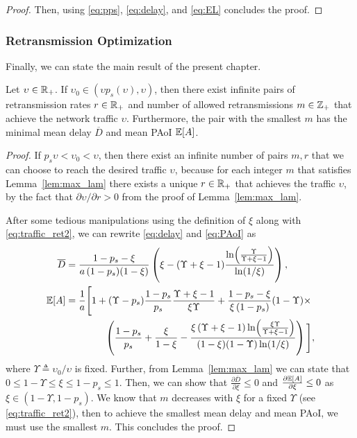 \begin{proof}
    Then, using \eqref{eq:pps}, \eqref{eq:delay}, and \eqref{eq:EL} concludes the proof.
\end{proof}

\subsubsection{Retransmission Optimization}
Finally, we can state the main result of the present chapter.%
\begin{proposition} \label{prop:best_m}
    Let $\upsilon\in{\mathbb R}_+$. If $\upsilon_0 \in (\upsilon p_s(\upsilon), \upsilon)$,
    then there exist infinite pairs of retransmission rates $r\in{\mathbb R}_+$ and number of allowed retransmissions $m\in{\mathbb Z}_+$ that achieve the network traffic $\upsilon$. Furthermore, the pair with the smallest $m$ has the minimal mean delay $\overline{D}$ and mean PAoI ${\mathbb E}[A]$.
\end{proposition}
%
\begin{proof}
    If $p_s \upsilon < \upsilon_0 < \upsilon$, then there exist an infinite number of pairs $m,r$ that we can choose to reach the desired traffic $\upsilon$, because for each integer $m$ that satisfies Lemma~\ref{lem:max_lam} there exists a unique $r\in{\mathbb R}_+$ that achieves the traffic $\upsilon$, by the fact that $\partial\upsilon/\partial r > 0$ from the proof of Lemma~\ref{lem:max_lam}.
    
    After some tedious manipulations using the definition of $\xi$ along with \eqref{eq:traffic_ret2}, we can rewrite \eqref{eq:delay} and \eqref{eq:PAoI} as
    \begin{align*}
        \overline D &= \frac{1-p_s-\xi}{ a\,(1-p_s)(1-\xi)} \left( \xi - (\Upsilon+\xi-1) \frac{\ln\!\left(\frac{\Upsilon}{\Upsilon+\xi-1}\right)}{\ln(1/\xi)} \right),\\
        {\mathbb E}[A] &= \frac{1}{a}\Bigg[ 1 + (\Upsilon-p_s)\frac{1-p_s}{p_s} \frac{\Upsilon+\xi-1}{\xi\Upsilon} + \frac{1-p_s-\xi}{\xi\,(1-p_s)} (1-\Upsilon) \times\\
            &\qquad\qquad \left(\frac{1-p_s}{p_s} + \frac{\xi}{1-\xi}
              - \frac{\xi\,(\Upsilon+\xi-1) \ln\!\left(\frac{\xi\Upsilon}{\Upsilon+\xi-1}\right)}{(1-\xi)(1-\Upsilon)\ln(1/\xi)} \right) \Bigg],
    \end{align*}
    where $\Upsilon \triangleq \upsilon_0/\upsilon$ is fixed. Further, from Lemma~\ref{lem:max_lam} we can state that $0 \le 1-\Upsilon \le \xi \le 1-p_s \le 1$.
    Then, we can show that $\frac{\partial \overline D}{\partial \xi} \le 0$ and $\frac{\partial {\mathbb E}[A]}{\partial \xi} \le 0$ as $\xi\in(1-\Upsilon,1-p_s)$.
    We know that $m$ decreases with $\xi$ for a fixed $\Upsilon$ (see \eqref{eq:traffic_ret2}), then to achieve the smallest mean delay and mean PAoI, we must use the smallest $m$. This concludes the proof.
\end{proof}

